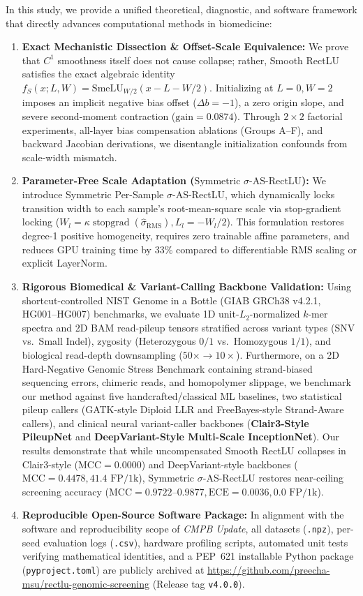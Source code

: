\documentclass[11pt,a4paper]{article}
\begin{document}
In this study, we provide a unified theoretical, diagnostic, and software framework that directly advances computational methods in biomedicine:
\begin{enumerate}
    \item \textbf{Exact Mechanistic Dissection \& Offset-Scale Equivalence:} We prove that $C^1$ smoothness itself does not cause collapse; rather, Smooth RectLU satisfies the exact algebraic identity $f_S(x; L, W) = \text{SmeLU}_{W/2}(x - L - W/2)$. Initializing at $L = 0, W = 2$ imposes an implicit negative bias offset ($\Delta b = -1$), a zero origin slope, and severe second-moment contraction ($\text{gain} = 0.0874$). Through $2\times 2$ factorial experiments, all-layer bias compensation ablations (Groups A--F), and backward Jacobian derivations, we disentangle initialization confounds from scale-width mismatch.
    \item \textbf{Parameter-Free Scale Adaptation ($\text{Symmetric } \sigma\text{-AS-RectLU}$):} We introduce Symmetric Per-Sample $\sigma$-AS-RectLU, which dynamically locks transition width to each sample's root-mean-square scale via stop-gradient locking ($W_l = \kappa \operatorname{stopgrad}(\hat{\sigma}_{\text{RMS}}), L_l = -W_l / 2$). This formulation restores degree-1 positive homogeneity, requires zero trainable affine parameters, and reduces GPU training time by $33\%$ compared to differentiable RMS scaling or explicit LayerNorm.
    \item \textbf{Rigorous Biomedical \& Variant-Calling Backbone Validation:} Using shortcut-controlled NIST Genome in a Bottle (GIAB GRCh38 v4.2.1, HG001--HG007) benchmarks, we evaluate 1D unit-$L_2$-normalized $k$-mer spectra and 2D BAM read-pileup tensors stratified across variant types (SNV vs.\ Small Indel), zygosity (Heterozygous $0/1$ vs.\ Homozygous $1/1$), and biological read-depth downsampling ($50\times \to 10\times$). Furthermore, on a 2D Hard-Negative Genomic Stress Benchmark containing strand-biased sequencing errors, chimeric reads, and homopolymer slippage, we benchmark our method against five handcrafted/classical ML baselines, two statistical pileup callers (GATK-style Diploid LLR and FreeBayes-style Strand-Aware callers), and clinical neural variant-caller backbones (\textbf{Clair3-Style PileupNet} and \textbf{DeepVariant-Style Multi-Scale InceptionNet}). Our results demonstrate that while uncompensated Smooth RectLU collapses in Clair3-style ($\text{MCC} = 0.0000$) and DeepVariant-style backbones ($\text{MCC} = 0.4478, 41.4\text{ FP/1k}$), Symmetric $\sigma$-AS-RectLU restores near-ceiling screening accuracy ($\text{MCC} = 0.9722$--$0.9877, \text{ECE} = 0.0036, 0.0\text{ FP/1k}$).
    \item \textbf{Reproducible Open-Source Software Package:} In alignment with the software and reproducibility scope of \textit{CMPB Update}, all datasets (\texttt{.npz}), per-seed evaluation logs (\texttt{.csv}), hardware profiling scripts, automated unit tests verifying mathematical identities, and a PEP~621 installable Python package (\texttt{pyproject.toml}) are publicly archived at \url{https://github.com/preecha-msu/rectlu-genomic-screening} (Release tag \texttt{v4.0.0}).
\end{enumerate}
\end{document}
